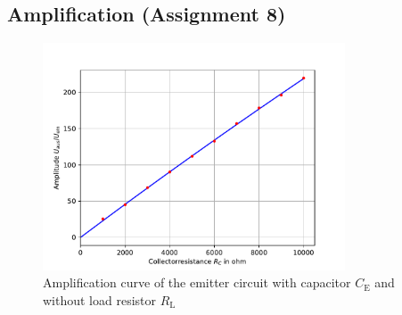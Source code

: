 \documentclass[11pt, a4paper]{article}
\begin{document}
\subsection{Amplification (Assignment 8)}
\begin{figure}[h]
    \centering
    \includegraphics[width=0.8\textwidth]{plots/RC1.pdf}
    \caption{Amplification curve of the emitter circuit with capacitor $C_{\text{E}}$ and without load resistor $R_{\text{L}}$}
    \label{fig:RC1}
\end{figure}
\end{document}
